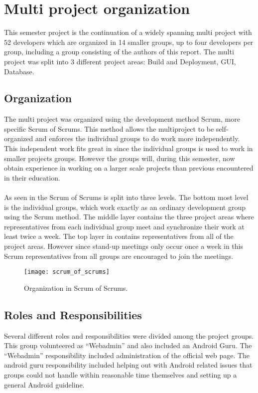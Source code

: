 
\section{Multi project organization}

This semester project is the continuation of a widely spanning multi project with 52 developers which are organized in 14 smaller groups, up to four developers per group, including a group consisting of the authors of this report. The multi project was split into 3 different project areas: Build and Deployment, GUI, Database. 

\subsection{Organization}
The multi project was organized using the development method Scrum\parencite{scrum}, more specific Scrum of Scrums. This method allows the multiproject to be self-organized and enforces the individual groups to do work more independently. This independent work fits great in since the individual groups is used to work in smaller projects groups. However the groups will, during this semester, now obtain experience in working on a larger scale projects than previous encountered in their education. 
\\\\
As seen in  the Scrum of Scrums is split into three levels. The bottom most level is the individual groups, which work exactly as an ordinary development group using the Scrum method. The middle layer contains the three project areas where representatives from each individual group meet and synchronize their work at least twice a week. The top layer in  contains representatives from all of the project areas. However since stand-up meetings only occur once a week in this Scrum representatives from all groups are encouraged to join the meetings.

\begin{figure}[!htbp]
  \centering
    \texttt{[image: scrum\_of\_scrums]}
    \caption{Organization in Scrum of Scrums.}
    \label{fig:scrum_of_scrums}
\end{figure}

\subsection{Roles and Responsibilities}
Several different roles and responsibilities were divided among the project groups. This group volunteered as ``Webadmin'' and also included an Android Guru. The ``Webadmin'' responsibility included administration of the official \giraf web page. The android guru responsibility included helping out with Android related issues that groups could not handle within reasonable time themselves and setting up a general Android guideline. 